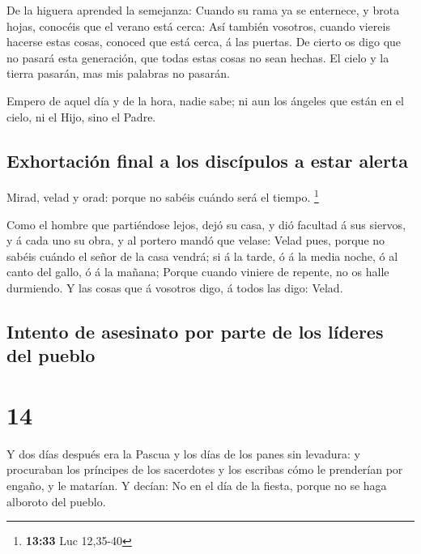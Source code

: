  De la higuera aprended la semejanza: Cuando su rama ya se
enternece, y brota hojas, conocéis que el verano está cerca:
 Así también vosotros, cuando viereis hacerse estas cosas,
conoced que está cerca, á las puertas.  De cierto os digo
que no pasará esta generación, que todas estas cosas no sean hechas.
 El cielo y la tierra pasarán, mas mis palabras no pasarán.

 Empero de aquel día y de la hora, nadie sabe; ni aun los
ángeles que están en el cielo, ni el Hijo, sino el Padre.

\hypertarget{exhortaciuxf3n-final-a-los-discuxedpulos-a-estar-alerta}{%
\subsection{Exhortación final a los discípulos a estar
alerta}\label{exhortaciuxf3n-final-a-los-discuxedpulos-a-estar-alerta}}

 Mirad, velad y orad: porque no sabéis cuándo será el
tiempo. \footnote{\textbf{13:33} Luc 12,35-40}

 Como el hombre que partiéndose lejos, dejó su casa, y dió
facultad á sus siervos, y á cada uno su obra, y al portero mandó que
velase:  Velad pues, porque no sabéis cuándo el señor de la
casa vendrá; si á la tarde, ó á la media noche, ó al canto del gallo, ó
á la mañana;  Porque cuando viniere de repente, no os halle
durmiendo.  Y las cosas que á vosotros digo, á todos las
digo: Velad.

\hypertarget{intento-de-asesinato-por-parte-de-los-luxedderes-del-pueblo}{%
\subsection{Intento de asesinato por parte de los líderes del
pueblo}\label{intento-de-asesinato-por-parte-de-los-luxedderes-del-pueblo}}

\hypertarget{section-13}{%
\section{14}\label{section-13}}

 Y dos días después era la Pascua y los días de los panes
sin levadura: y procuraban los príncipes de los sacerdotes y los
escribas cómo le prenderían por engaño, y le matarían.  Y
decían: No en el día de la fiesta, porque no se haga alboroto del
pueblo.

